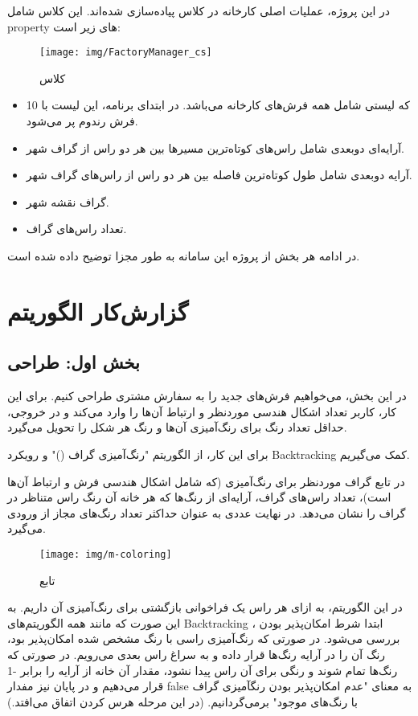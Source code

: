\documentclass[12pt]{article}
\begin{document}
	در این پروژه، عملیات اصلی کارخانه در کلاس  پیاده‌سازی شده‌اند.
	این کلاس شامل property های زیر است:
	\begin{figure}[H]
		\centering
		\texttt{[image: img/FactoryManager\_cs]}
		\caption{کلاس }
		\label{fig:factorymanagercs}
	\end{figure}
	\begin{itemize}
		\item
		که لیستی شامل همه فرش‌های کارخانه می‌باشد. در ابتدای برنامه، این لیست با 10 فرش رندوم پر می‌شود.
		\item
		آرایه‌ای دوبعدی شامل راس‌های کوتاه‌ترین مسیرها بین هر دو راس از گراف شهر.
		\item
		آرایه دوبعدی شامل طول کوتاه‌ترین فاصله بین هر دو راس از راس‌های گراف شهر.
		\item
		گراف نقشه شهر.
		\item
		تعداد راس‌های گراف.
	\end{itemize}

	در ادامه ‌هر بخش از پروژه این سامانه به طور مجزا توضیح داده شده است.
	\newpage
	\section{گزارش‌کار الگوریتم}
	\subsection{بخش اول: طراحی}
	در این بخش، می‌خواهیم فرش‌های جدید را به سفارش مشتری طراحی کنیم. برای این کار، کاربر تعداد اشکال هندسی موردنظر و ارتباط آن‌ها را وارد می‌کند و در خروجی،‌ حداقل تعداد رنگ برای رنگ‌آمیزی آن‌ها و رنگ هر شکل را تحویل می‌گیرد.

	برای این کار، از الگوریتم "رنگ‌آمیزی گراف ()" و رویکرد Backtracking کمک می‌گیریم.

	در تابع
	گراف موردنظر برای رنگ‌آمیزی (که شامل اشکال هندسی فرش و ارتباط آن‌ها است)، تعداد راس‌های گراف، آرایه‌ای از رنگ‌ها که هر خانه آن رنگ راس متناظر در گراف را نشان می‌دهد. در نهایت عددی به عنوان حداکثر تعداد رنگ‌های مجاز از ورودی می‌گیرد.
	\begin{figure}[H]
		\centering
		\texttt{[image: img/m-coloring]}
		\caption{تابع }
		\label{fig:m-coloring}
	\end{figure}
	در این الگوریتم، به ازای هر راس یک فراخوانی بازگشتی برای رنگ‌آمیزی آن داریم.
	به این صورت که مانند همه الگوریتم‌های Backtracking ، ابتدا شرط امکان‌پذیر بودن بررسی می‌شود. در صورتی که رنگ‌آمیزی راسی با رنگ مشخص شده امکان‌پذیر بود، رنگ آن را در آرایه رنگ‌ها قرار داده و به سراغ راس بعدی می‌رویم. در صورتی که رنگ‌ها تمام شوند و رنگی برای آن راس پیدا نشود، مقدار آن خانه از آرایه را برابر -1 قرار می‌دهیم و در پایان نیز مفدار false به معنای "عدم امکان‌پذیر بودن رنگآمیزی گراف با رنگ‌های موجود" برمی‌گردانیم. (در این مرحله هرس کردن اتفاق می‌افتد.)
\end{document}
